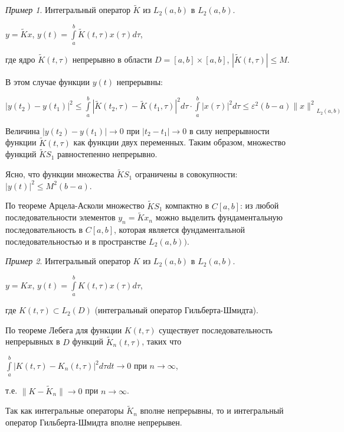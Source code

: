 \documentclass[12pt,a4paper,titlepage,oneside]{book}
\theoremstyle{definition}
\theoremstyle{plain}
\theoremstyle{remark}
\theoremstyle{remark}
\newtheorem*{example}{Пример}
\theoremstyle{remark}
\theoremstyle{remark}
\theoremstyle{plain}
\theoremstyle{plain}
\begin{document}
\begin{example}Интегральный оператор $\widetilde{K}$ из $L_2(a,b)$ в $L_2(a,b)$.

\begin{center}
$y=\widetilde{K}x$, $y(t)=\int\limits_a^b \widetilde{K}(t, \tau)x(\tau)d\tau$,
\end{center}

где ядро $\widetilde{K}(t, \tau)$ непрерывно в области $D=[a,b]\times[a,b]$, $|\widetilde{K}(t, \tau)|\leq M$.

В этом случае функции $y(t)$ непрерывны:

\begin{center}
$|y(t_2)-y(t_1)|^2\leq \int\limits_a^b |\widetilde{K}(t_2, \tau)-\widetilde{K}(t_1, \tau)|^2d\tau \cdot \int\limits_a^b |x(\tau)|^2 d\tau \leq \varepsilon^2 (b-a){\lVert x\rVert^2}_{L_2(a,b)}$
\end{center}

Величина $|y(t_2)-y(t_1)|\to 0$ при $|t_2-t_1|\to 0$ в силу непрерывности функции $\widetilde{K}(t, \tau)$ как функции двух переменных. Таким образом, множество функций $\widetilde{K} S_1$ равностепенно непрерывно.

Ясно, что функции множества $\widetilde{K} S_1$ ограничены в совокупности: $|y(t)|^2 \leq M^2 (b-a)$.

По теореме Арцела-Асколи множество $\widetilde{K} S_1$ компактно в $C[a,b]$: из любой последовательности элементов $y_n=\widetilde{K} x_n$ можно выделить фундаментальную последовательность в $C[a,b]$, которая является фундаментальной последовательностью и в пространстве $L_2 (a,b))$.
\end{example}
\begin{example}Интегральный оператор $K$ из $L_2(a,b)$ в $L_2(a,b)$.
\begin{center}
$y=Kx$, $y(t)=\int\limits_a^b K(t, \tau)x(\tau)d\tau $,
\end{center}
где $K(t, \tau)\subset L_2(D)$ (интегральный оператор Гильберта-Шмидта).

По теореме Лебега для функции $K(t, \tau)$ существует последовательность непрерывных в $D$ функций $\widetilde{K}_n (t, \tau)$, таких что
\begin{center}
$\int\limits_a^b |K(t, \tau)-K_n(t, \tau)|^2d\tau dt \to 0$ при $n\to \infty$,
\end{center}
\begin{center}
т.е. $\lVert K-\widetilde{K}_n \rVert \to 0$ при $n\to \infty$.
\end{center}

Так как интегральные операторы $\widetilde{K}_n$ вполне непрерывны, то и интегральный оператор Гильберта-Шмидта вполне непрерывен.
\end{example}
\end{document}
